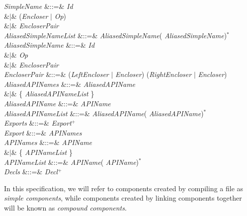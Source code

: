 \begin{GrammarTwo}
\emph{SimpleName} &::=& \emph{Id} \\
&$|$&   (\emph{Encloser} $|$ \emph{Op}) \\
&$|$&   \emph{EncloserPair} \\

\emph{AliasedSimpleNameList}
&::=& \emph{AliasedSimpleName}(\EXP{,} \emph{AliasedSimpleName})$^*$ \\

\emph{AliasedSimpleName} &::=& \emph{Id} \\
&$|$&  \emph{Op}  \\
&$|$&  \emph{EncloserPair}  \\

\emph{EncloserPair} &::=&
(\emph{LeftEncloser} $|$ \emph{Encloser}) \option{\EXP{\cdot}}
(\emph{RightEncloser} $|$ \emph{Encloser})\\

\emph{AliasedAPINames} &::=& \emph{AliasedAPIName} \\
&$|$& \{ \emph{AliasedAPINameList} \}\\

\emph{AliasedAPIName} &::=& \emph{APIName} \\

\emph{AliasedAPINameList} &::=& \emph{AliasedAPIName}(\EXP{,} \emph{AliasedAPIName})$^*$ \\

\emph{Exports} &::=& \emph{Export}$^+$\\

\emph{Export} &::=&  \emph{APINames} \\

\emph{APINames} &::=& \emph{APIName} \\
&$|$& \{ \emph{APINameList} \}\\

\emph{APINameList} &::=& \emph{APIName}(\EXP{,} \emph{APIName})$^*$ \\

\emph{Decls} &::=& \emph{Decl}$^+$\\
\end{GrammarTwo}

In this specification, we will refer to components created by
compiling a file as \emph{simple components}, while components created by
linking components together will be known as \emph{compound
components}.

